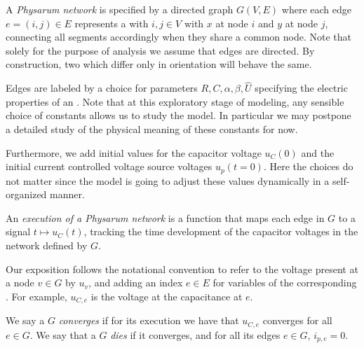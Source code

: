   A {\em Physarum network\/} is specified by a directed graph $G(V,E)$ where each edge $e = (i,j) \in E$ represents a \Pe with $i,j \in V$ with $x$ at node $i$ and $y$ at node $j$, connecting all segments accordingly when they share a common node.
  Note that solely for the purpose of analysis we assume that edges are directed. By construction, two \Pes which differ only in orientation will behave the same.

  Edges are labeled by a choice for parameters $R,C,\alpha,\beta,\hat{U}$ specifying the electric properties of an \Pe. Note that at this exploratory stage of modeling, any sensible choice of constants allows us to study the model. In particular we may postpone a detailed study of the physical meaning of these constants for now. 

  Furthermore, we add initial values for the capacitor voltage $u_C(0)$ and the initial current controlled voltage source voltages $u_p(t=0)$. Here the choices do not matter since the model is going to adjust these values dynamically in a self-organized manner.

  An {\em execution of a Physarum network\/} is a function that maps each edge in $G$ to a signal $t \mapsto u_C(t)$, tracking the time development of the capacitor voltages in the network defined by $G$.

  Our exposition follows the notational convention to refer to the voltage present at a node $v \in G$ by $u_v$, and adding an index $e \in E$ for variables of the corresponding \Pe. For example, $u_{C,e}$ is the voltage at the capacitance at \Pe $e$.

  We say a \Pn $G$ {\em converges\/} if for its execution we have that $u_{C,e}$ converges for all $e \in G$. We say that a \Pn $G$ {\em dies\/} if it converges, and for all its edges $e \in G$, $i_{p,e} = 0$.
  
